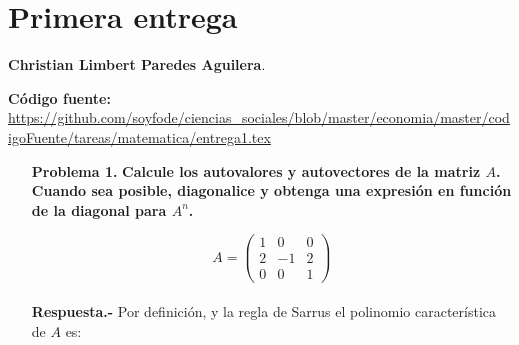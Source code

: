 \section*{\center \large Primera entrega}
\begin{center}
    \textbf{Christian Limbert Paredes Aguilera}.
\end{center}
\begin{center}
    \textbf{Código fuente:} \url{https://github.com/soyfode/ciencias_sociales/blob/master/economia/master/codigoFuente/tareas/matematica/entrega1.tex}
\end{center}
\vspace{1cm}

\begin{enumerate}

    \item[\bfseries Problema 1.] \textbf{\boldmath Calcule los autovalores y autovectores de la matriz $A$. Cuando sea posible, diagonalice y obtenga una expresión en función de la diagonal para $A^n$.}

    $$A=\left(\begin{array}{*{3}{r}}
	1 & 0 & 0 \\
	2 & -1 & 2 \\
	0 & 0 & 1 
    \end{array}\right)$$\\

    \textbf{Respuesta.-}\;  Por definición, y la regla de Sarrus el polinomio característica de $A$ es:
    

\end{enumerate}
